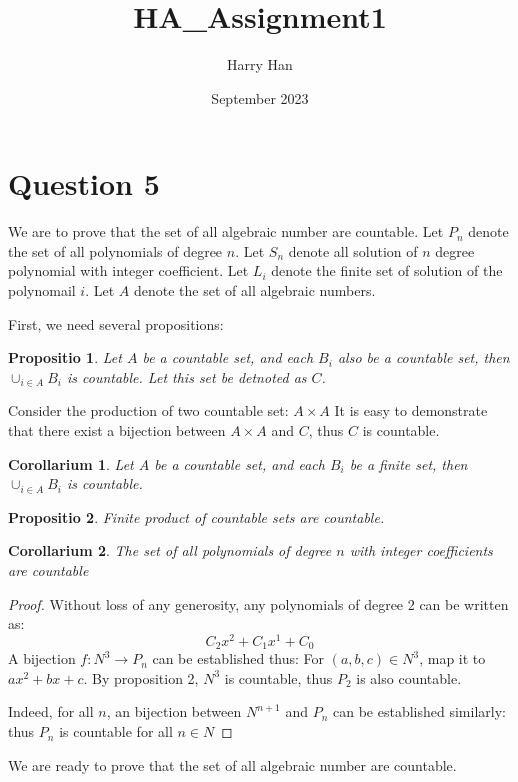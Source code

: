 \documentclass{article}
\title{HA_Assignment1}
\author{Harry Han}
\date{September 2023}
\newtheorem{proposition}{Propositio}
\newtheorem{corollary}{Corollarium}[proposition]
\theoremstyle{definition}
\theoremstyle{definition}
\theoremstyle{remark}
\begin{document}
\section*{Question 5}

We are to prove that the set of all algebraic number are countable. Let $P_n$ denote the set of all polynomials of degree $n$.
Let $S_n$ denote all solution of $n$ degree polynomial with integer coefficient. Let $L_i$ denote the finite set of solution of the polynomail $i$. Let $A$ denote the set of all algebraic numbers.

First, we need several propositions:

\begin{proposition}
Let $A$ be a countable set, and each $B_i$ also be a countable set,
then $\displaystyle\cup_{i\in A} B_i$ is countable. Let this set be detnoted as $C$.
\end{proposition}

Consider the production of two countable set: $A\times A$ It is easy to demonstrate that there exist a bijection between $A\times A$ and $C$, thus $C$ is countable.

\begin{corollary}
Let $A$ be a countable set, and each $B_i$ be a finite set,
then $\displaystyle\cup_{i\in A} B_i$ is countable.
\end{corollary}

\begin{proposition}
    Finite product of countable sets are countable.
\end{proposition}


\begin{corollary}
The set of all polynomials of degree $n$ with integer coefficients are countable
\end{corollary}

\begin{proof} 
    Without loss of any generosity, any polynomials of degree $2$ can be written as:
    $$
    C_2x^2 + C_{1}x^{1} + C_0
    $$
    A bijection $f: N^3 \rightarrow P_n$ can be established thus:
    For $(a,b,c) \in N^3$, map it to $ax^2+bx+c$. 
    By proposition 2, $N^3$ is countable, thus $P_2$ is also countable.

    Indeed, for all $n$, an bijection between $N^{n+1}$ and $P_n$ can be established similarly: thus $P_n$ is countable for all $n\in N$ 
\end{proof}

We are ready to prove that the set of all algebraic number are countable.
\end{document}

